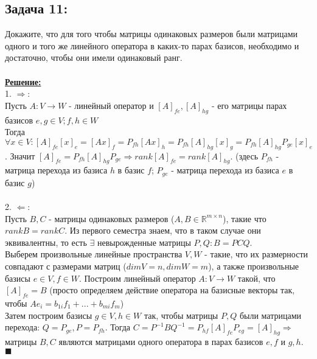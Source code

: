 \documentclass[a4paper,12pt,titlepage,final]{article}
\begin{document}
\subsection*{Задача 11:}
\noindent Докажите, что для того чтобы матрицы одинаковых размеров были матрицами одного и того
же линейного оператора в каких-то парах базисов, необходимо и достаточно, чтобы они имели
одинаковый ранг. \\ \\
\textbf{\underline{Решение:}} \\
1. $\Rightarrow:$ \\
Пусть $A: V \rightarrow W$ - линейный оператор и $[A]_{fe}, [A]_{hg}$ - его матрицы парах базисов
$e, g \in V; f, h \in W$ \\
Тогда $\forall x \in V: [A]_{fe} [x]_e = [Ax]_f = P_{fh} [Ax]_h = P_{fh} [A]_{hg} [x]_g = P_{fh} [A]_{hg} P_{ge} [x]_e$.
Значит $[A]_{fe} = P_{fh} [A]_{hg} P_{ge} \Rightarrow rank[A]_{fe} = rank[A]_{hg}$.
(здесь $P_{fh}$ - матрица перехода из базиса $h$ в базис $f$; $P_{ge}$ - матрица перехода из базиса $e$ в базис $g$) \\ \\
2. $\Leftarrow:$ \\
Пусть $B, C$ - матрицы одинаковых размеров ($A, B \in \mathbb{R}^{m \times n}$), такие что $rankB = rankC$. Из первого семестра знаем, что в таком случае
они эквивалентны, то есть $\exists$ невырожденные матрицы $P, Q: B = PCQ$. \\
Выберем произвольные линейные пространства $V, W$ - такие, что их размерности совпадают с размерами матриц ($dimV = n, dimW = m$),
а также произвольные базисы $e \in V, f \in W$. Построим линейный оператор $A: V \rightarrow W$ такой, что
$[A]_{fe} = B$ (просто определяем действие оператора на базисные векторы так, чтобы $Ae_i = b_{1i}f_1 + ... + b_{mi} f_m$) \\
Затем построим базисы $g \in V, h \in W$ так, чтобы матрицы $P, Q$ были матрицами перехода:
$Q = P_{ge}, P = P_{fh}$. Тогда $C = P^{-1}BQ^{-1} = P_{hf} [A]_{fe} P_{eg} = [A]_{hg} \Rightarrow$
матрицы $B, C$ являются матрицами одного оператора в парах базисов $e, f$ и $g, h$. \\ $\blacksquare$ \\ \\ \\


\end{document}
